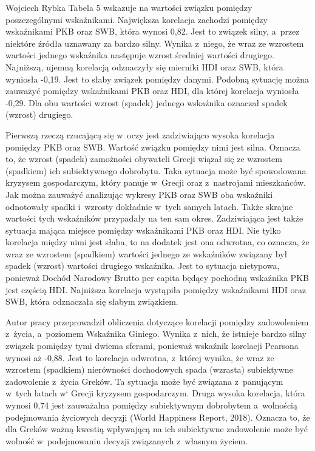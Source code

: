 \begin{artplenv}{Wojciech Rybka}
Tabela 5 wskazuje na wartości związku pomiędzy poszczególnymi wskaźnikami. Największa korelacja zachodzi pomiędzy
wskaźnikami PKB oraz SWB, która wynosi 0,82. Jest to związek silny, a~przez niektóre źródła uznawany za bardzo silny.
Wynika z~niego, że wraz ze wzrostem wartości jednego wskaźnika następuje wzrost średniej wartości drugiego. Najniższą,
ujemną korelacją odznaczyły się mierniki HDI oraz SWB, która wyniosła -0,19. Jest to słaby związek pomiędzy danymi.
Podobną sytuację można zauważyć pomiędzy wskaźnikami PKB oraz HDI, dla której korelacja wyniosła -0,29. Dla obu
wartości wzrost (spadek) jednego wskaźnika oznaczał spadek (wzrost) drugiego. 

Pierwszą rzeczą rzucającą się w~oczy jest zadziwiająco wysoka korelacja pomiędzy PKB oraz SWB. Wartość
związku pomiędzy nimi jest silna. Oznacza to, że wzrost (spadek) zamożności obywateli
Grecji wiązał się ze wzrostem (spadkiem) ich subiektywnego dobrobytu. Taka sytuacja może być spowodowana kryzysem
gospodarczym, który panuje w~Grecji oraz z~nastrojami mieszkańców. Jak można zauważyć analizując wykresy PKB oraz SWB
oba wskaźniki odnotowały spadki i~wzrosty dokładnie w~tych samych latach. Także skrajne wartości tych wskaźników
przypadały na ten sam okres. Zadziwiająca jest także sytuacja mająca miejsce pomiędzy wskaźnikami PKB oraz HDI. Nie
tylko korelacja między nimi jest słaba, to na dodatek jest ona odwrotna, co oznacza, że wraz ze wzrostem (spadkiem)
wartości jednego ze wskaźników związany był spadek (wzrost) wartości drugiego wskaźnika. Jest to sytuacja nietypowa,
ponieważ Dochód Narodowy Brutto per capita będący pochodną wskaźnika PKB jest częścią HDI. Najniższa korelacja
wystąpiła pomiędzy wskaźnikami HDI oraz SWB, która odznaczała się słabym związkiem. 

Autor pracy przeprowadził obliczenia dotyczące korelacji pomiędzy zadowoleniem z~życia, a~poziomem Wskaźnika Giniego.
Wynika z~nich, że istnieje bardzo silny związek pomiędzy tymi dwiema sferami, ponieważ wskaźnik korelacji Pearsona
wynosi aż -0,88. Jest to korelacja odwrotna, z~której wynika, że wraz ze wzrostem (spadkiem) nierówności dochodowych
spada (wzrasta) subiektywne zadowolenie z~życia Greków. Ta sytuacja może być związana z~panującym w~tych
latach w` Grecji kryzysem gospodarczym. Druga wysoka korelacja, która wynosi 0,74 jest zauważalna pomiędzy subiektywnym
dobrobytem a~wolnością podejmowania życiowych decyzji \label{ref:RNDaAxMI6IUZa}(World Happiness Report, 2018). Oznacza
to, że dla Greków ważną kwestią wpływającą na ich subiektywne zadowolenie może być wolność w~podejmowaniu decyzji
związanych z~własnym życiem.


\end{artplenv}
